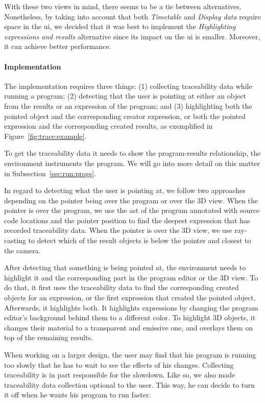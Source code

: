 With these two views in mind, there seems to be a tie between alternatives.
Nonetheless, by taking into account that both {\it Timetable} and {\it Display data} require space in the \gls{ui}, we decided that it was best to implement the {\it Highlighting expressions and results} alternative since its impact on the \gls{ui} is smaller.
Moreover, it can achieve better performance.

\paragraph{Implementation}
The implementation requires three things:
(1) collecting traceability data while running a program;
(2) detecting that the user is pointing at either an object from the results or an expression of the program;
and (3) highlighting both the pointed object and the corresponding creator expression, or both the pointed expression and the corresponding created results, as exemplified in Figure~\ref{fig:trace:example}.

To get the traceability data it needs to show the program-results relationship, the environment instruments the program.
We will go into more detail on this matter in Subsection~\ref{sec:run:progs}.

In regard to detecting what the user is pointing at, we follow two approaches depending on the pointer being over the program or over the 3D view.
When the pointer is over the program, we use the \gls{ast} of the program annotated with source code locations and the pointer position to find the deepest expression that has recorded traceability data.
When the pointer is over the 3D view, we use ray-casting to detect which of the result objects is below the pointer and closest to the camera.

After detecting that something is being pointed at, the environment needs to highlight it and the corresponding part in the program editor or the 3D view.
To do that, it first uses the traceability data to find the corresponding created objects for an expression, or the first expression that created the pointed object.
Afterwards, it highlights both.
It highlights expressions by changing the program editor's background behind them to a different color.
To highlight 3D objects, it changes their material to a transparent and emissive one, and overlays them on top of the remaining results.

When working on a larger design, the user may find that his program is running too slowly that he has to wait to see the effects of his changes.
Collecting traceability is in part responsible for the slowdown.
Like so, we also made traceability data collection optional to the user.
This way, he can decide to turn it off when he wants his program to run faster.

